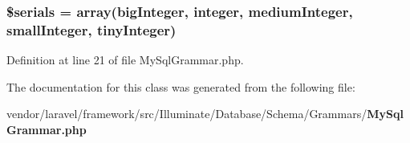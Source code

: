 \subsubsection[{\$serials}]{\setlength{\rightskip}{0pt plus 5cm}\$serials = array(\textquotesingle{}big\+Integer\textquotesingle{}, \textquotesingle{}integer\textquotesingle{}, \textquotesingle{}medium\+Integer\textquotesingle{}, \textquotesingle{}small\+Integer\textquotesingle{}, \textquotesingle{}tiny\+Integer\textquotesingle{})\hspace{0.3cm}{\ttfamily [protected]}}\label{class_illuminate_1_1_database_1_1_schema_1_1_grammars_1_1_my_sql_grammar_a151ecd4bab2e85de938891e925a040c2}


Definition at line 21 of file My\+Sql\+Grammar.\+php.



The documentation for this class was generated from the following file\+:\begin{DoxyCompactItemize}
\item 
vendor/laravel/framework/src/\+Illuminate/\+Database/\+Schema/\+Grammars/{\bf My\+Sql\+Grammar.\+php}\end{DoxyCompactItemize}
